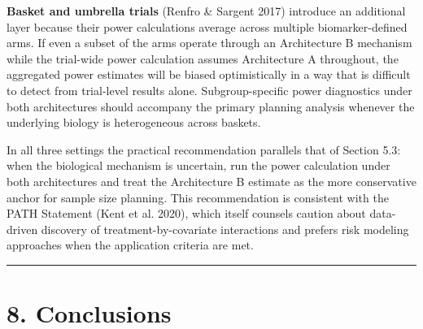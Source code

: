 \documentclass[11pt]{article}
\begin{document}
\textbf{Basket and umbrella trials} (Renfro \& Sargent 2017)
introduce an additional layer because their power calculations
average across multiple biomarker-defined arms. If even a
subset of the arms operate through an Architecture B
mechanism while the trial-wide power calculation assumes
Architecture A throughout, the aggregated power estimates will
be biased optimistically in a way that is difficult to detect
from trial-level results alone. Subgroup-specific power
diagnostics under both architectures should accompany the
primary planning analysis whenever the underlying biology is
heterogeneous across baskets.

In all three settings the practical recommendation parallels
that of Section 5.3: when the biological mechanism is uncertain,
run the power calculation under both architectures and treat
the Architecture B estimate as the more conservative anchor for
sample size planning. This recommendation is consistent with
the PATH Statement (Kent et al. 2020), which itself counsels
caution about data-driven discovery of treatment-by-covariate
interactions and prefers risk modeling approaches when the
application criteria are met.

\bigskip\noindent\rule{\textwidth}{0.4pt}\bigskip

\section{8. Conclusions}
\end{document}
